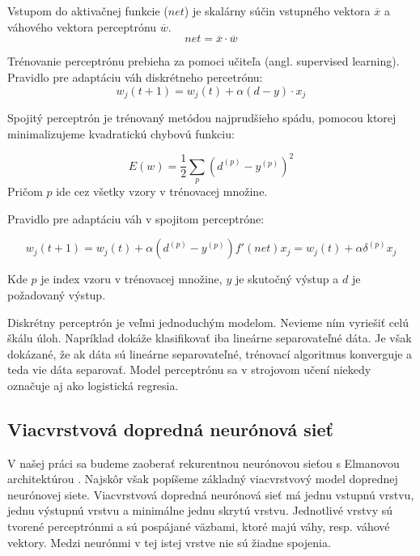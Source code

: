 Vstupom do aktivačnej funkcie ($net$) je skalárny súčin vstupného vektora $\overline{x}$ a 
váhového vektora perceptrónu $\overline{w}$.
\begin{equation}
	net = \overline{x} \cdot \overline{w}
\end{equation}

Trénovanie perceptrónu prebieha za pomoci učiteľa (angl. supervised learning).
Pravidlo pre adaptáciu váh diskrétneho percetrónu:
\begin{equation}
	w_j(t+1) = w_j(t) + \alpha (d - y)\cdot x_j
\end{equation}

Spojitý perceptrón je trénovaný metódou najprudšieho spádu, pomocou
ktorej minimalizujeme kvadratickú chybovú funkciu:

\begin{equation}
	E(w) = \frac{1}{2}\sum_{p}\left(d^{(p)} - y^{(p)}\right)^{2} 
\end{equation}
Pričom $p$ ide cez všetky vzory v trénovacej množine.

Pravidlo pre adaptáciu váh v spojitom perceptróne:

\begin{equation}
	w_{j}(t+1) = w_{j}(t) + \alpha (d^{(p)} - y^{(p)})f'(net)x_{j} = w_{j}(t) + \alpha \delta^{(p)}x_{j}
\end{equation}

Kde $p$ je index vzoru v trénovacej množine, $y$ je skutočný výstup a $d$ je požadovaný výstup.

Diskrétny perceptrón je veľmi jednoduchým modelom. 
Nevieme ním vyriešiť celú škálu úloh. Napríklad dokáže klasifikovať 
iba lineárne separovateľné dáta. Je však dokázané, že ak dáta sú lineárne separovateľné, trénovací algoritmus
konverguje a teda vie dáta separovať.
Model perceptrónu sa v strojovom učení niekedy označuje aj ako logistická regresia.

\subsection{Viacvrstvová dopredná neurónová sieť}
V našej práci sa budeme zaoberať rekurentnou neurónovou sieťou s Elmanovou architektúrou \cite{Elman90findingstructure}. 
Najskôr však popíšeme základný viacvrstvový model doprednej neurónovej siete. 
Viacvrstvová dopredná neurónová sieť má jednu vstupnú vrstvu, jednu výstupnú vrstvu a minimálne jednu skrytú vrstvu. 
Jednotlivé vrstvy sú tvorené perceptrónmi a sú pospájané väzbami, ktoré majú váhy, resp. váhové vektory. 
Medzi neurónmi v tej istej vrstve nie sú žiadne spojenia.

